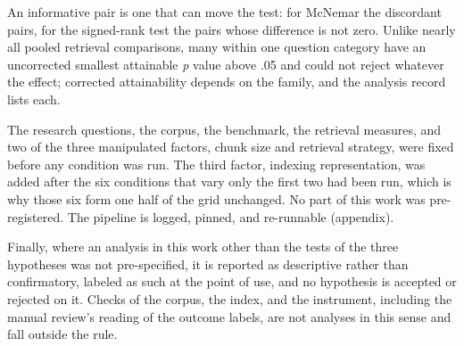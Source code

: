 An informative pair is one that can move the test: for McNemar the
discordant pairs, for the signed-rank test the pairs whose difference is not
zero.
Unlike nearly all pooled retrieval comparisons, many within one question
category have an uncorrected smallest attainable \emph{p} value above .05 and
could not reject whatever the effect; corrected attainability depends on the
family, and the analysis record lists each.

The research questions, the corpus, the benchmark, the retrieval measures, and
two of the three manipulated factors, chunk size and retrieval strategy, were
fixed before any condition was run. The third factor, indexing representation,
was added after the six conditions that vary only the first two had been run,
which is why those six form one half of the grid unchanged. No part of this
work was pre-registered. The pipeline is logged, pinned, and re-runnable
(appendix).

Finally, where an analysis in this work other than the tests of the three
hypotheses was not pre-specified, it is reported as descriptive rather than
confirmatory, labeled as such at the point of use, and no hypothesis is
accepted or rejected on it. Checks of the corpus, the index, and the instrument, including the manual
review's reading of the outcome labels, are not analyses in this sense and fall
outside the rule.
